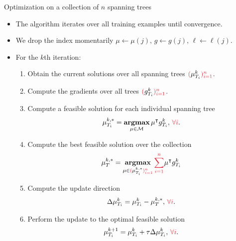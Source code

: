\documentclass[first=dgreen,second=purple,logo=yellowexc]{aaltoslides}
\begin{document}
\begin{frame}{Optimization on a collection of $n$ spanning trees}
	\begin{itemize}\footnotesize
		\item The algorithm iterates over all training examples until convergence.
		\item We drop the index momentarily $\mu\leftarrow\mu(j),\,g\leftarrow g(j),\,\ell\leftarrow\ell(j)$.
		\item For the $k$th iteration:
		\begin{enumerate}\footnotesize
			\item Obtain the current solutions over all spanning trees ${\color{aaltored}(}\vmu_{T_i}^k{\color{aaltored})_{i=1}^n}$.
			\item Compute the gradients over all trees ${\color{aaltored}(}g_{T_i}^k{\color{aaltored})_{i=1}^n}$.
			\item Compute a feasible solution for each individual spanning tree
			\begin{align*}
				{\vmu}_{T_i}^{k,*} = \underset{\vmu\in\Mcal}{\argmax}\,\vmu\tp g_{T_i}^k,\,{\color{aaltored}\forall i}.
			\end{align*}
			\item Compute the best feasible solution over the collection
			\begin{align*}
				{\vmu}_{T}^{k,*} = \underset{\vmu\in{\color{aaltored}(}{\vmu}_{T_i}^{k,*}{\color{aaltored})_{i=1}^n}}{\argmax}\,{\color{aaltored}\sum_{i=1}^n}\vmu\tp g_{T_i}^k
			\end{align*}
			\item Compute the update direction 
			\begin{align*}
				\Delta\vmu_{T_i}^{k} = {\vmu}_{T_i}^{k} - {\vmu}_{T}^{k,*},\,{\color{aaltored}\forall i}.
			\end{align*}
			\item Perform the update to the optimal feasible solution 
			\begin{align*}
				\vmu_{T_i}^{k+1} = \vmu_{T_i}^k + \tau\Delta\vmu_{T_i}^{k},\,{\color{aaltored}\forall i}.
			\end{align*}
		\end{enumerate}
	\end{itemize}
\end{frame}
\end{document}
